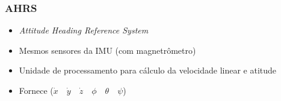 \documentclass{beamer}
\begin{document}
\begin{frame}	
	
	\frametitle{AHRS}	
		
	\begin{itemize}
		
		\item \textit{Attitude Heading Reference System}
		
		\item Mesmos sensores da IMU (com magnetrômetro)
		
		\item Unidade de processamento para cálculo da velocidade linear e atitude
		
		\item Fornece (${ \dot { x }  }\quad { \dot { y }  }\quad { \dot { z }  }\quad { \phi  }\quad { \theta  }\quad { \psi  }$)
	 
	\end{itemize}
\end{frame}	
\end{document}
